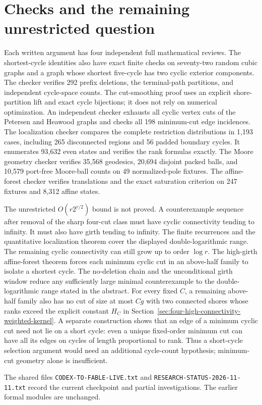 \documentclass[11pt]{article}
\begin{document}
\section{Checks and the remaining unrestricted question}
Each written argument has four independent full mathematical reviews.
The shortest-cycle identities also have exact finite checks on seventy-two random cubic graphs and a graph whose shortest five-cycle has two cyclic exterior components.
The checker verifies 292 prefix deletions, the terminal-path partitions, and independent cycle-space counts.
The cut-smoothing proof uses an explicit shore-partition lift and exact cycle bijections; it does not rely on numerical optimization.
An independent checker exhausts all cyclic vertex cuts of the Petersen and Heawood graphs and checks all 198 minimum-cut edge incidences.
The localization checker compares the complete restriction distributions in 1,193 cases, including 265 disconnected regions and 56 padded boundary cycles.
It enumerates 93,632 even states and verifies the rank formulas exactly.
The Moore geometry checker verifies 35,568 geodesics, 20,694 disjoint packed balls, and 10,579 port-free Moore-ball counts on 49 normalized-pole fixtures.
The affine-forest checker verifies translations and the exact saturation criterion on 247 fixtures and 8,312 affine states.

The unrestricted $O(r2^{r/2})$ bound is not proved.
A counterexample sequence after removal of the sharp four-cut class must have cyclic connectivity tending to infinity.
It must also have girth tending to infinity.
The finite recurrences and the quantitative localization theorem cover the displayed double-logarithmic range.
The remaining cyclic connectivity can still grow up to order $\log r$.
The high-girth affine-forest theorem forces each minimum cyclic cut in an above-half family to isolate a shortest cycle.
The no-deletion chain and the unconditional girth window reduce any sufficiently large minimal counterexample to the double-logarithmic range stated in the abstract.
For every fixed $C$, a remaining above-half family also has no cut of size at most $Cg$ with two connected shores whose ranks exceed the explicit constant $H_C$ in Section~\ref{sec:four-high-connectivity-weighted-kernel}.
A separate construction shows that an edge of a minimum cyclic cut need not lie on a short cycle: even a unique fixed-order minimum cut can have all its edges on cycles of length proportional to rank.
Thus a short-cycle selection argument would need an additional cycle-count hypothesis; minimum-cut geometry alone is insufficient.

The shared files \nolinkurl{CODEX-TO-FABLE-LIVE.txt} and \nolinkurl{RESEARCH-STATUS-2026-11-11.txt} record the current checkpoint and partial investigations.
The earlier formal modules are unchanged.
\end{document}

